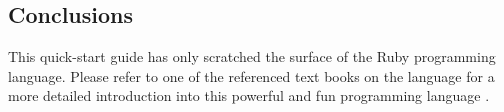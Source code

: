\begin{bibunit}
\subsection{Conclusions}
This quick-start guide has only scratched the surface of the Ruby programming language. Please refer to one of the referenced text books on the language for a more detailed introduction into this powerful and fun programming language \cite{Thomas2004, Flanagan2008}.

\renewcommand{\bibsection}{\section{\bibname}}
\putbib
\end{bibunit}